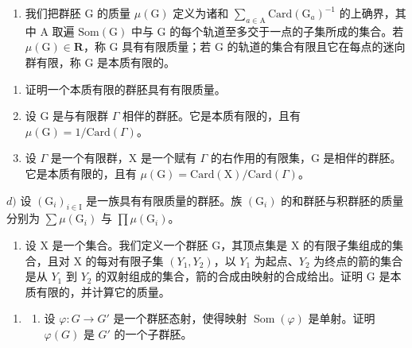 \begin{enumerate}
\def\labelenumi{\arabic{enumi})}
\setcounter{enumi}{3}
\tightlist
\item
  我们把群胚 G 的质量 \(\mu(\mathrm{G})\) 定义为诸和 \(\sum_{a\in\mathrm{A}}\mathrm{Card}(\mathrm{G}_{a})^{-1}\) 的上确界，其中 A 取遍 \(\mathrm{Som}(\mathrm{G})\) 中与 G 的每个轨道至多交于一点的子集所成的集合。若 \(\mu(\mathrm{G})\in\mathbf{R}\)，称 G 具有有限质量；若 G 的轨道的集合有限且它在每点的迷向群有限，称 G 是本质有限的。
\end{enumerate}

\begin{enumerate}
\def\labelenumi{\alph{enumi})}
\item
  证明一个本质有限的群胚具有有限质量。
\item
  设 G 是与有限群 \(\Gamma\) 相伴的群胚。它是本质有限的，且有 \(\mu(\mathrm{G}) = 1/\mathrm{Card}(\Gamma)\)。
\item
  设 \(\Gamma\) 是一个有限群，X 是一个赋有 \(\Gamma\) 的右作用的有限集，G 是相伴的群胚。它是本质有限的，且有 \(\mu(\mathrm{G}) = \mathrm{Card}(\mathrm{X}) / \mathrm{Card}(\Gamma)\)。
\end{enumerate}

\(d)\) 设 \((\mathrm{G}_i)_{i\in \mathrm{I}}\) 是一族具有有限质量的群胚。族 \((\mathrm{G}_i)\) 的和群胚与积群胚的质量分别为 \(\sum \mu (\mathrm{G}_i)\) 与 \(\prod \mu (\mathrm{G}_i)\)。

\begin{enumerate}
\def\labelenumi{\alph{enumi})}
\setcounter{enumi}{4}
\tightlist
\item
  设 X 是一个集合。我们定义一个群胚 G，其顶点集是 X 的有限子集组成的集合，且对 X 的每对有限子集 \((Y_{1}, Y_{2})\)，以 \(Y_{1}\) 为起点、\(Y_{2}\) 为终点的箭的集合是从 \(Y_{1}\) 到 \(Y_{2}\) 的双射组成的集合，箭的合成由映射的合成给出。证明 G 是本质有限的，并计算它的质量。
\end{enumerate}

\begin{enumerate}
\def\labelenumi{\arabic{enumi})}
\setcounter{enumi}{4}
\tightlist
\item
  \begin{enumerate}
  \def\labelenumii{\alph{enumii})}
  \tightlist
  \item
    设 \(\varphi\colon G\to G'\) 是一个群胚态射，使得映射 \(\operatorname{Som}(\varphi)\) 是单射。证明 \(\varphi(G)\) 是 \(G'\) 的一个子群胚。
  \end{enumerate}
\end{enumerate}

